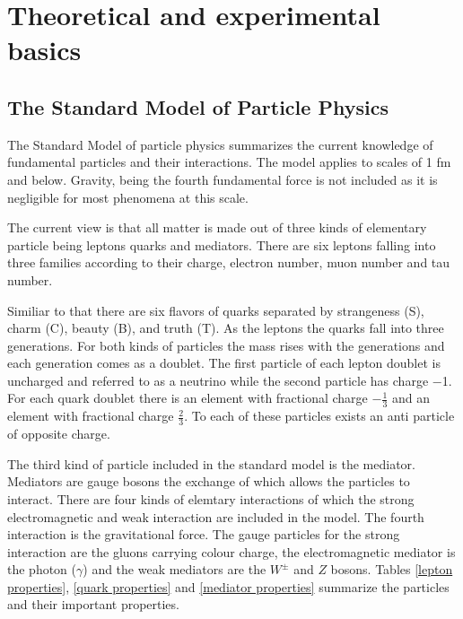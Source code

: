 \chapter{Theoretical and experimental basics}
\label{theory}

\section{The Standard Model of Particle Physics}

The Standard Model of particle physics summarizes the current knowledge of fundamental particles and their interactions. The model applies to scales of 1 fm and below. Gravity, being the fourth fundamental force is not included as it is negligible for most phenomena at this scale.

The current view is that all matter is made out of three kinds of elementary particle being leptons quarks and mediators.
There are six leptons falling into three families according to their charge, electron number, muon number and tau number. 

Similiar to that there are six flavors of quarks separated by strangeness (S), charm (C), beauty (B), and truth (T). As the leptons the quarks fall into three generations.
For both kinds of particles the mass rises with the generations and each generation comes as a doublet. The first particle of each lepton doublet is uncharged and referred to as a neutrino while the second particle has charge \num{-1}.
For each quark doublet there is an element with fractional charge $-\frac{1}{3}$ and an element with fractional charge $\frac{2}{3}$.
To each of these particles exists an anti particle of opposite charge.

The third kind of particle included in the standard model is the mediator. Mediators are gauge bosons the exchange of which allows the particles to interact. There are four kinds of elemtary interactions of which the strong electromagnetic and weak interaction are included in the model. The fourth interaction is the gravitational force.
The gauge particles for the strong interaction are the gluons carrying colour charge, the electromagnetic mediator is the photon ($\gamma$) and the weak mediators are the $W^{\pm}$ and $Z$ bosons.
Tables \ref{lepton properties}, \ref{quark properties} and \ref{mediator properties} summarize the particles and their important properties.
\newpage


